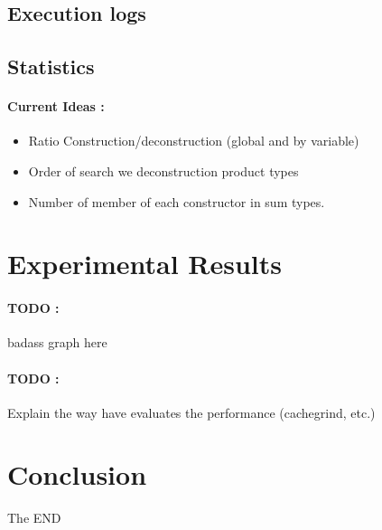 \documentclass[12pt]{article}
\begin{document}
\subsection{Execution logs}

\subsection{Statistics}

\paragraph{Current Ideas :}
\begin{itemize}
\item Ratio Construction/deconstruction (global and by variable)
\item Order of search we deconstruction product types
\item Number of member of each constructor in sum types.
\end{itemize}

\section{Experimental Results}

\paragraph{TODO :} badass graph here

\paragraph{TODO :} Explain the way have evaluates the performance (cachegrind, etc.)



\section{Conclusion}


\begin{center}
  The END
\end{center}
\end{document}
